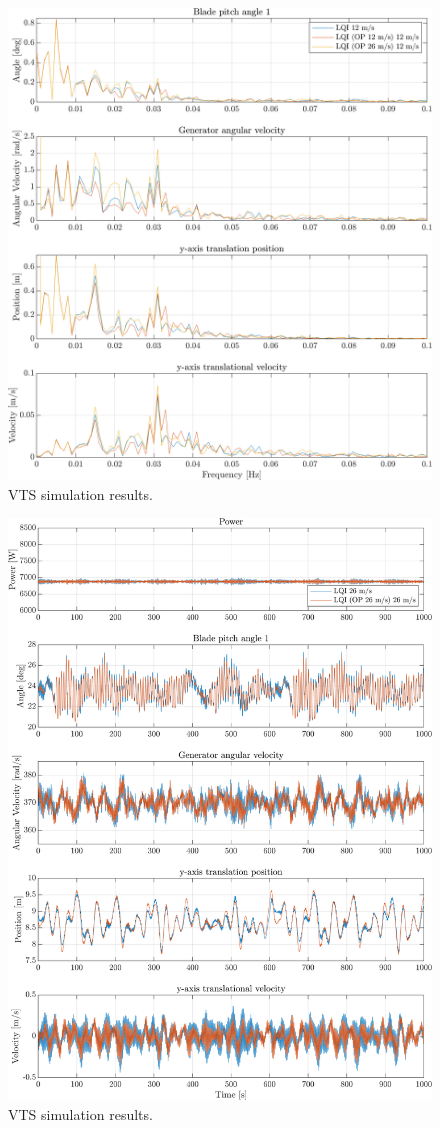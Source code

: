 \begin{figure}[ht]
	\centering
	\includegraphics[width=0.7\linewidth]{Graphics/TestResults/VTSplotting/21_fft_th_w_py_vy.png}
	\caption{VTS simulation results.}
	\label{fig:vts_21_fft_th_w_py_vy}
\end{figure}


\begin{figure}[ht]
	\centering
	\includegraphics[width=0.7\linewidth]{Graphics/TestResults/VTSplotting/30_pow_th_w_py_vy.png}
	\caption{VTS simulation results.}
	\label{fig:vts_30_pow_th_w_py_vy}
\end{figure}


